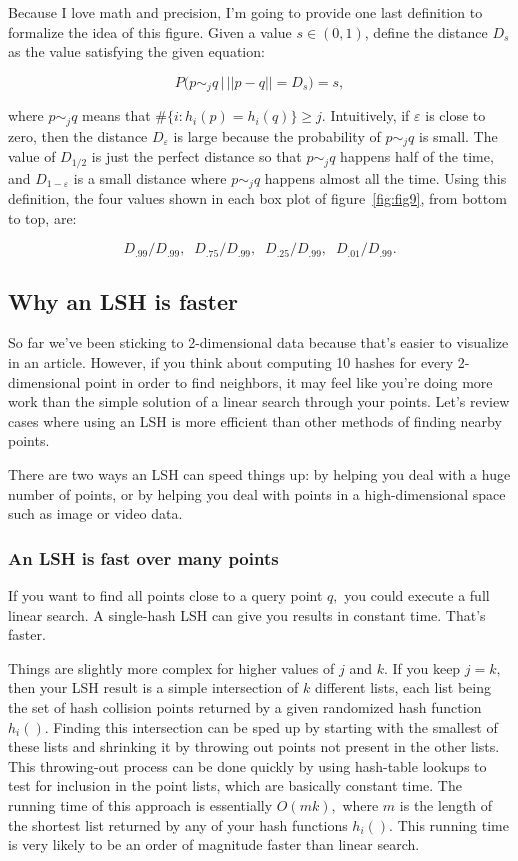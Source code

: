 \documentclass[20pt,]{extarticle}
\begin{document}
Because I love math and precision, I'm going to provide one last
definition to formalize the idea of this figure. Given a value
\(s \in (0, 1)\), define the distance \(D_s\) as the value satisfying
the given equation:

\[ P\big(p \sim_j q \, \big| \, ||p-q|| = D_s\big) = s, \]

where \(p\sim_j q\) means that \(\#\{i : h_i(p) = h_i(q)\} \ge j.\)
Intuitively, if \(\varepsilon\) is close to zero, then the distance
\(D_\varepsilon\) is large because the probability of \(p\sim_j q\) is
small. The value of \(D_{1/2}\) is just the perfect distance so that
\(p \sim_j q\) happens half of the time, and \(D_{1-\varepsilon}\) is a
small distance where \(p \sim_j q\) happens almost all the time. Using
this definition, the four values shown in each box plot of
figure~\ref{fig:fig9}, from bottom to top, are:

\[D_{.99} / D_{.99} ,\;\;
D_{.75} / D_{.99}   ,\;\;
D_{.25} / D_{.99}   ,\;\;
D_{.01} / D_{.99}.\]

\subsection{Why an LSH is faster}\label{why-an-lsh-is-faster}

So far we've been sticking to 2-dimensional data because that's easier
to visualize in an article. However, if you think about computing 10
hashes for every 2-dimensional point in order to find neighbors, it may
feel like you're doing more work than the simple solution of a linear
search through your points. Let's review cases where using an LSH is
more efficient than other methods of finding nearby points.

There are two ways an LSH can speed things up: by helping you deal with
a huge number of points, or by helping you deal with points in a
high-dimensional space such as image or video data.

\subsubsection{An LSH is fast over many
points}\label{an-lsh-is-fast-over-many-points}

If you want to find all points close to a query point \(q,\) you could
execute a full linear search. A single-hash LSH can give you results in
constant time. That's faster.

Things are slightly more complex for higher values of \(j\) and \(k.\)
If you keep \(j=k,\) then your LSH result is a simple intersection of
\(k\) different lists, each list being the set of hash collision points
returned by a given randomized hash function \(h_i().\) Finding this
intersection can be sped up by starting with the smallest of these lists
and shrinking it by throwing out points not present in the other lists.
This throwing-out process can be done quickly by using hash-table
lookups to test for inclusion in the point lists, which are basically
constant time. The running time of this approach is essentially
\(O(mk),\) where \(m\) is the length of the shortest list returned by
any of your hash functions \(h_i().\) This running time is very likely
to be an order of magnitude faster than linear search.
\end{document}
